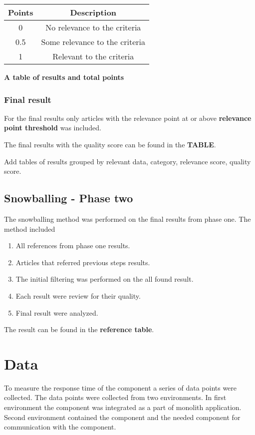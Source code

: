 \begin{flushleft}
\begin{tabular}{|c c|} 
 \hline
 Points & Description \\ [0.5ex] 
 \hline
  0 & No relevance to the criteria  \\ 
 \hline
  0.5 & Some relevance to the criteria \\ 
 \hline
 1 & Relevant to the criteria \\ 
 \hline
\end{tabular}
\end{flushleft}

\textbf{A table of results and total points}

\subsubsection{Final result}
For the final results only articles with the relevance point at or above \textbf{relevance point threshold} was included.

The final results with the quality score can be found in the \textbf{TABLE}.

Add tables of results grouped by relevant data, category, relevance score, quality score.

\subsection{Snowballing - Phase two}
The snowballing method was performed on the final results from phase one.
The method included 
\begin{enumerate}
    \item All references from phase one results.
    \item Articles that referred previous steps results.
    \item The initial filtering was performed on the all found result.
    \item Each result were review for their quality.
    \item Final result were analyzed. 
\end{enumerate}

The result can be found in the \textbf{reference table}.

\section{Data}
To measure the response time of the component a series of data points were collected.
The data points were collected from two environments.
In first environment the component was integrated as a part of monolith application.
Second environment contained the component and the needed component for communication with the component.

